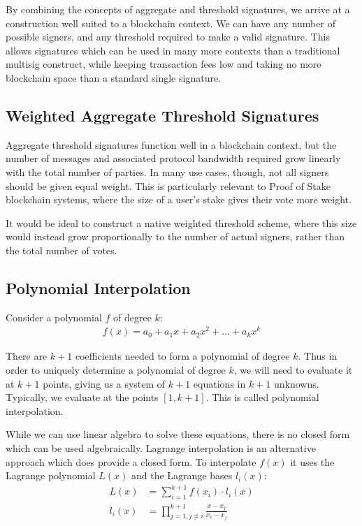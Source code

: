 \documentclass{article}
\begin{document}
By combining the concepts of aggregate and threshold signatures, we arrive at a construction well suited to a blockchain context.  We can have any number of possible signers, and any threshold required to make a valid signature.  This allows signatures which can be used in many more contexts than a traditional multisig construct, while keeping transaction fees low and taking no more blockchain space than a standard single signature.

\subsection{
  Weighted Aggregate Threshold Signatures
}

Aggregate threshold signatures function well in a blockchain context, but the number of messages and associated protocol bandwidth required grow linearly with the total number of parties.  In many use cases, though, not all signers should be given equal weight.  This is particularly relevant to Proof of Stake blockchain systems, where the size of a user's stake gives their vote more weight.

It would be ideal to construct a native weighted threshold scheme, where this size would instead grow proportionally to the number of actual signers, rather than the total number of votes.  

\subsection{
  Polynomial Interpolation
}

Consider a polynomial $f$ of degree $k$:
\begin{align}
  f(x) = a_0 + a_1 x + a_2 x^2 + ... + a_k x^k\nonumber
\end{align}

There are $k+1$ coefficients needed to form a polynomial of degree $k$.  Thus in order to uniquely determine a polynomial of degree $k$, we will need to evaluate it at $k+1$ points, giving us a system of $k+1$ equations in $k+1$ unknowns.  Typically, we evaluate at the points $[1, k+1]$.  This is called polynomial interpolation.

While we can use linear algebra to solve these equations, there is no closed form which can be used algebraically.  Lagrange interpolation \cite{lagrange} is an alternative approach which does provide a closed form.  To interpolate $f(x)$ it uses the Lagrange polynomial $L(x)$ and the Lagrange bases $l_i(x)$:
\begin{align}
  L(x) &= \sum_{i=1}^{k+1} f(x_i) \cdot l_i(x)\\
  l_i(x) &= \prod_{j=1, j \neq i}^{k+1} \frac{x - x_j}{x_i - x_j}
\end{align}
\end{document}
